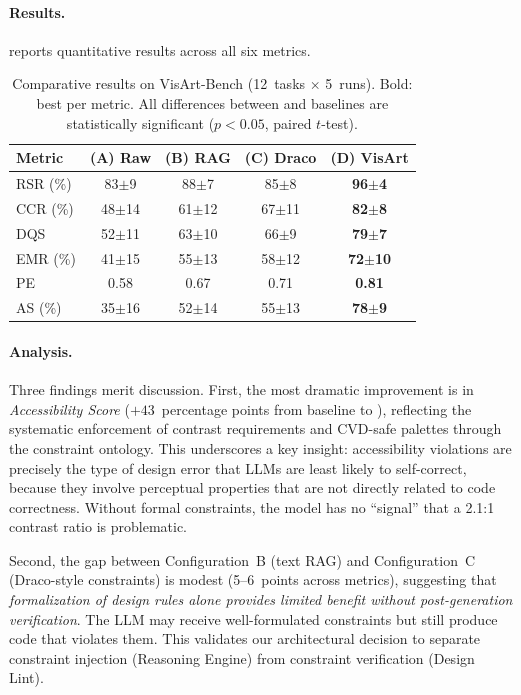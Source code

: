 \paragraph{Results.}
 reports quantitative results across all six metrics.

\begin{table}[!t]
\centering
\caption{Comparative results on VisArt-Bench (12~tasks $\times$ 5~runs). Bold: best per metric. All differences between \sysname{} and baselines are statistically significant ($p < 0.05$, paired $t$-test).}
\label{tab:results}
\small
\begin{tabular}{@{}lcccc@{}}
\toprule
\textbf{Metric} & \textbf{(A) Raw} & \textbf{(B) RAG} & \textbf{(C) Draco} & \textbf{(D) VisArt} \\
\midrule
RSR (\%) & 83$\pm$9 & 88$\pm$7 & 85$\pm$8 & \textbf{96$\pm$4} \\
CCR (\%) & 48$\pm$14 & 61$\pm$12 & 67$\pm$11 & \textbf{82$\pm$8} \\
DQS     & 52$\pm$11 & 63$\pm$10 & 66$\pm$9 & \textbf{79$\pm$7} \\
EMR (\%) & 41$\pm$15 & 55$\pm$13 & 58$\pm$12 & \textbf{72$\pm$10} \\
PE      & 0.58 & 0.67 & 0.71 & \textbf{0.81} \\
AS (\%) & 35$\pm$16 & 52$\pm$14 & 55$\pm$13 & \textbf{78$\pm$9} \\
\bottomrule
\end{tabular}
\end{table}

\paragraph{Analysis.}
Three findings merit discussion. First, the most dramatic improvement is in \textit{Accessibility Score} ($+43$~percentage points from baseline to \sysname{}), reflecting the systematic enforcement of contrast requirements and CVD-safe palettes through the constraint ontology. This underscores a key insight: accessibility violations are precisely the type of design error that LLMs are least likely to self-correct, because they involve perceptual properties that are not directly related to code correctness. Without formal constraints, the model has no ``signal'' that a 2.1:1 contrast ratio is problematic.

Second, the gap between Configuration~B (text RAG) and Configuration~C (Draco-style constraints) is modest (5--6~points across metrics), suggesting that \textit{formalization of design rules alone provides limited benefit without post-generation verification}. The LLM may receive well-formulated constraints but still produce code that violates them. This validates our architectural decision to separate constraint injection (Reasoning Engine) from constraint verification (Design Lint).


